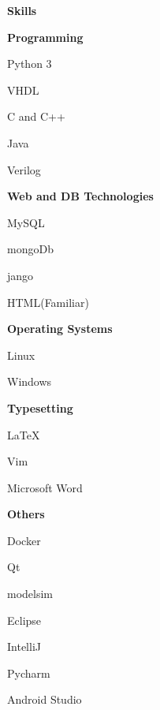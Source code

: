 \documentclass[a4paper,12pt,final]{memoir}
\newcommand{\SmallSep}{\vspace{0.5em}}
\newcommand{\CVSection}[1]
	{\Large\textbf{#1}\par
	\SmallSep\normalsize\normalfont}
\newcommand{\CVItem}[1]
	{\textbf{\color{RoyalBlue} #1}}
\begin{document}
\CVSection{Skills}
\CVItem{Programming}
\begin{multicols}{3}
\begin{compactitem}[\color{RoyalBlue}$\circ$]
	\item Python 3
	\item VHDL
	\item C and C++
	\item Java
	\item Verilog
	
\end{compactitem}
\end{multicols}
\SmallSep
\CVItem{Web and DB Technologies}
\begin{multicols}{3}
\begin{compactitem}[\color{RoyalBlue}$\circ$]
	\item MySQL 
	\item mongoDb
	\item jango
	\item HTML(Familiar)
\end{compactitem}
\end{multicols}
\SmallSep
\CVItem{Operating Systems}
\begin{multicols}{3}
\begin{compactitem}[\color{RoyalBlue}$\circ$]
	\item Linux
	\item Windows
\end{compactitem}
\end{multicols}
\SmallSep
\CVItem{Typesetting}
\begin{multicols}{3}
\begin{compactitem}[\color{RoyalBlue}$\circ$]
	\item \LaTeX
	\item Vim
	\item Microsoft Word
\end{compactitem}
\end{multicols}
\SmallSep
\CVItem{Others}
\begin{multicols}{3}
\begin{compactitem}[\color{RoyalBlue}$\circ$]
	\item Docker
	\item Qt
	\item modelsim
	\item Eclipse
	\item IntelliJ
	\item Pycharm
	\item Android Studio
\end{compactitem}
\end{multicols}
\end{document}
